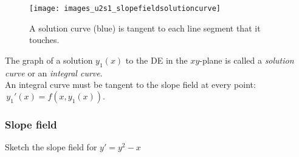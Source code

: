 \begin{figure}[ht!]
  \centering
  \texttt{[image: images\_u2s1\_slopefieldsolutioncurve]}
  \caption{A solution curve (blue) is tangent to each line segment that it touches.}
\end{figure}

The graph of a solution $y_1 (x)$ to the DE in the $xy$-plane is called a
\emph{\color{blue} solution curve} or an \emph{\color{blue} integral curve}. \\
An integral curve must be tangent to the slope field at every point:
$\displaystyle \, y_1'(x)=f\left(x, y_1(x)\right).$
\clearpage

\subsubsection{Slope field}

\begin{example}
  Sketch the slope field for $y'=y^2-x$
\end{example}



